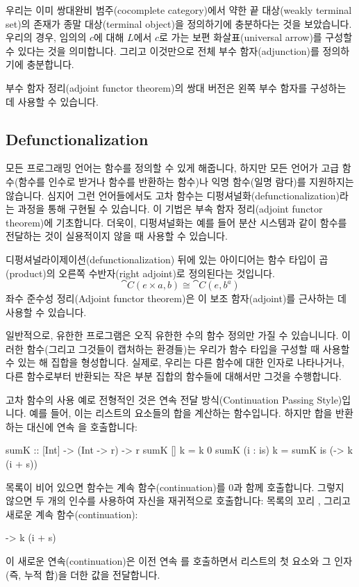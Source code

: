 \documentclass[DaoFP]{subfiles}
\begin{document}
우리는 이미 쌍대완비 범주(cocomplete category)에서 약한 끝 대상(weakly terminal set)의 존재가 종말 대상(terminal object)을 정의하기에 충분하다는 것을 보았습니다. 우리의 경우, 임의의 $c$에 대해 $L$에서 $c$로 가는 보편 화살표(universal arrow)를 구성할 수 있다는 것을 의미합니다. 그리고 이것만으로 전체 부수 함자(adjunction)를 정의하기에 충분합니다.

부수 함자 정리(adjoint functor theorem)의 쌍대 버전은 왼쪽 부수 함자를 구성하는 데 사용할 수 있습니다.

\subsection{Defunctionalization}

모든 프로그래밍 언어는 함수를 정의할 수 있게 해줍니다, 하지만 모든 언어가 고급 함수(함수를 인수로 받거나 함수를 반환하는 함수)나 익명 함수(일명 람다)를 지원하지는 않습니다. 심지어 그런 언어들에서도 고차 함수는 디펑셔널화(defunctionalization)라는 과정을 통해 구현될 수 있습니다. 이 기법은 부속 함자 정리(adjoint functor theorem)에 기초합니다. 더욱이, 디펑셔널화는 예를 들어 분산 시스템과 같이 함수를 전달하는 것이 실용적이지 않을 때 사용할 수 있습니다.

디펑셔널라이제이션(defunctionalization) 뒤에 있는 아이디어는 함수 타입이 곱(product)의 오른쪽 수반자(right adjoint)로 정의된다는 것입니다.
\[ \cat C(e \times a, b) \cong \cat C(e, b^a) \]
좌수 준수성 정리(Adjoint functor theorem)은 이 보조 함자(adjoint)를 근사하는 데 사용할 수 있습니다.

일반적으로, 유한한 프로그램은 오직 유한한 수의 함수 정의만 가질 수 있습니니다. 이러한 함수(그리고 그것들이 캡처하는 환경들)는 우리가 함수 타입을 구성할 때 사용할 수 있는 해 집합을 형성합니다. 실제로, 우리는 다른 함수에 대한 인자로 나타나거나, 다른 함수로부터 반환되는 작은 부분 집합의 함수들에 대해서만 그것을 수행합니다.

고차 함수의 사용 예로 전형적인 것은 연속 전달 방식(Continuation Passing Style)입니다. 예를 들어, 이는 리스트의 요소들의 합을 계산하는 함수입니다. 하지만 합을 반환하는 대신에 연속 을 호출합니다:
\begin{haskell}
sumK :: [Int] -> (Int -> r) -> r
sumK [] k = k 0
sumK (i : is) k =
  sumK is (\s -> k (i + s))
\end{haskell}
목록이 비어 있으면 함수는 계속 함수(continuation)를 0과 함께 호출합니다. 그렇지 않으면 두 개의 인수를 사용하여 자신을 재귀적으로 호출합니다: 목록의 꼬리 , 그리고 새로운 계속 함수(continuation):
\begin{haskell}
\s -> k (i + s)
\end{haskell}
이 새로운 연속(continuation)은 이전 연속 를 호출하면서 리스트의 첫 요소와 그 인자  (즉, 누적 합)을 더한 값을 전달합니다.
\end{document}
